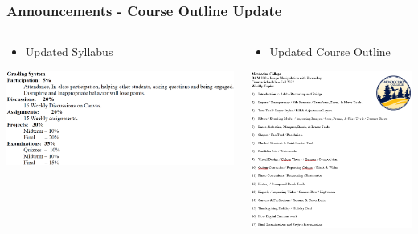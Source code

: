 \documentclass{beamer}
\begin{document}
\begin{frame}
	\frametitle{Announcements - Course Outline Update}
		\begin{columns}
		\vspace{-25pt}
	\begin{center}
				\begin{itemize}
			\item Updated Syllabus
		\end{itemize}
	\includegraphics[width = 1.0\textwidth]{images/syllabus update.png}
\end{center}

		\begin{center}
							\begin{itemize}
				\item Updated Course Outline
			\end{itemize}
			\includegraphics[width = 1.1\textwidth]{images/Outline Update.png}
		\end{center}
	\end{columns}

\end{frame}
\end{document}
